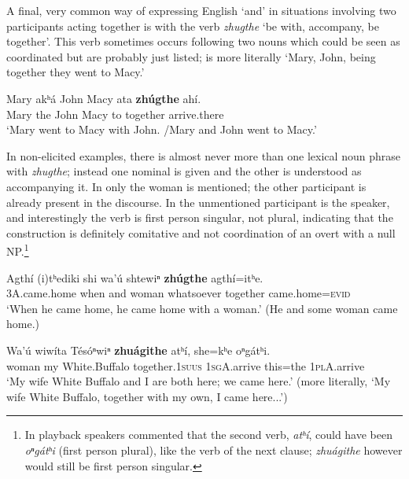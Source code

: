 \documentclass[output=paper]{LSP/langsci}
\begin{document}
 A final, very common way of expressing English `and' in situations involving two participants acting together is with the verb \textit{zhugthe} `be with, accompany, be together'. This verb sometimes occurs following two nouns which could be seen as coordinated but are probably just listed;  is more literally `Mary, John, being together they went to Macy.'

\begin{exe}	
\ex\label{ex:rudin:29}
\gll Mary akʰá  John	Macy ata 	\textbf{zhúgthe} 	ahí. \\
Mary the John Macy to  together arrive.there \\
\trans `Mary went to Macy with John. /Mary and John went to Macy.'
\end{exe}

In non-elicited examples, there is almost never more than one lexical noun phrase with \textit{zhugthe}; instead one nominal is given and the other is understood as accompanying it. In  only the woman is mentioned; the other participant is already present in the discourse. In  the unmentioned participant is the speaker, and interestingly the verb is first person singular, not plural, indicating that the construction is definitely comitative and not coordination of an overt with a null NP.\footnote{In playback speakers commented that the second verb, \textit{atʰí}, could have been \textit{oⁿgátʰi} (first person plural), like the verb of the next clause; \textit{zhuágithe} however would still be first person singular.}   

\ea\label{ex:rudin:30}
\gll Agthí (i)tʰediki shi wa'ú shtewiⁿ \textbf{zhúgthe} agthí=itʰe.\\
\textsc{3A}.came.home 	when and woman whatsoever together came.home=\textsc{evid}\\
\trans `When he came home, he came home with a woman.' (He and some woman came home.)
\z

\ea\label{ex:rudin:31}
\gll Wa'ú  wiwíta Tésóⁿwiⁿ \textbf{zhuágithe}  atʰí, she=kʰe oⁿgátʰi.\\
woman 	my  White.Buffalo together.1\textsc{suus}  \textsc{1sgA}.arrive	this=the 	\textsc{1plA}.arrive\\
\trans `My wife White Buffalo and I are both here; we came here.' (more literally, `My wife White Buffalo, together with my own, I came here...')
\z
\end{document}
